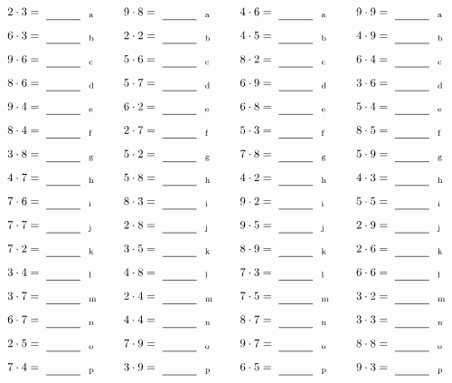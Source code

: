 \documentclass
[
  draft    = true,
  fontsize = 11pt,
  parskip  = half-
]
{scrartcl}
\begin{document}
\par\vfill\par
\begin{align*}
    \pline{2\cdot3}&=\rline{a}
  & \pline{9\cdot8}&=\rline{a}
  & \pline{4\cdot6}&=\rline{a}
  & \pline{9\cdot9}&=\rline{a} \\[1ex]
    \pline{6\cdot3}&=\rline{b}
  & \pline{2\cdot2}&=\rline{b}
  & \pline{4\cdot5}&=\rline{b}
  & \pline{4\cdot9}&=\rline{b} \\[1ex]
    \pline{9\cdot6}&=\rline{c}
  & \pline{5\cdot6}&=\rline{c}
  & \pline{8\cdot2}&=\rline{c}
  & \pline{6\cdot4}&=\rline{c} \\[1ex]
    \pline{8\cdot6}&=\rline{d}
  & \pline{5\cdot7}&=\rline{d}
  & \pline{6\cdot9}&=\rline{d}
  & \pline{3\cdot6}&=\rline{d} \\[1ex]
    \pline{9\cdot4}&=\rline{e}
  & \pline{6\cdot2}&=\rline{e}
  & \pline{6\cdot8}&=\rline{e}
  & \pline{5\cdot4}&=\rline{e} \\[1ex]
    \pline{8\cdot4}&=\rline{f}
  & \pline{2\cdot7}&=\rline{f}
  & \pline{5\cdot3}&=\rline{f}
  & \pline{8\cdot5}&=\rline{f} \\[1ex]
    \pline{3\cdot8}&=\rline{g}
  & \pline{5\cdot2}&=\rline{g}
  & \pline{7\cdot8}&=\rline{g}
  & \pline{5\cdot9}&=\rline{g} \\[1ex]
    \pline{4\cdot7}&=\rline{h}
  & \pline{5\cdot8}&=\rline{h}
  & \pline{4\cdot2}&=\rline{h}
  & \pline{4\cdot3}&=\rline{h} \\[1ex]
    \pline{7\cdot6}&=\rline{i}
  & \pline{8\cdot3}&=\rline{i}
  & \pline{9\cdot2}&=\rline{i}
  & \pline{5\cdot5}&=\rline{i} \\[1ex]
    \pline{7\cdot7}&=\rline{j}
  & \pline{2\cdot8}&=\rline{j}
  & \pline{9\cdot5}&=\rline{j}
  & \pline{2\cdot9}&=\rline{j} \\[1ex]
    \pline{7\cdot2}&=\rline{k}
  & \pline{3\cdot5}&=\rline{k}
  & \pline{8\cdot9}&=\rline{k}
  & \pline{2\cdot6}&=\rline{k} \\[1ex]
    \pline{3\cdot4}&=\rline{l}
  & \pline{4\cdot8}&=\rline{l}
  & \pline{7\cdot3}&=\rline{l}
  & \pline{6\cdot6}&=\rline{l} \\[1ex]
    \pline{3\cdot7}&=\rline{m}
  & \pline{2\cdot4}&=\rline{m}
  & \pline{7\cdot5}&=\rline{m}
  & \pline{3\cdot2}&=\rline{m} \\[1ex]
    \pline{6\cdot7}&=\rline{n}
  & \pline{4\cdot4}&=\rline{n}
  & \pline{8\cdot7}&=\rline{n}
  & \pline{3\cdot3}&=\rline{n} \\[1ex]
    \pline{2\cdot5}&=\rline{o}
  & \pline{7\cdot9}&=\rline{o}
  & \pline{9\cdot7}&=\rline{o}
  & \pline{8\cdot8}&=\rline{o} \\[1ex]
    \pline{7\cdot4}&=\rline{p}
  & \pline{3\cdot9}&=\rline{p}
  & \pline{6\cdot5}&=\rline{p}
  & \pline{9\cdot3}&=\rline{p}
\end{align*}
\end{document}
